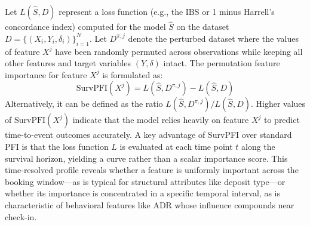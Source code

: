 \documentclass[pdflatex,iicol,sn-mathphys-ay]{sn-jnl}
\theoremstyle{thmstyleone}%
\theoremstyle{thmstyletwo}%
\theoremstyle{thmstylethree}%
\begin{document}
Let $L(\hat{S}, D)$ represent a loss function (e.g., the IBS or 1 minus Harrell's concordance index) computed for the model $\hat{S}$ on the dataset $D = \{(X_i, Y_i, \delta_i)\}_{i=1}^N$. Let $D^{\pi, j}$ denote the perturbed dataset where the values of feature $X^j$ have been randomly permuted across observations while keeping all other features and target variables $(Y, \delta)$ intact. The permutation feature importance for feature $X^j$ is formulated as:
\begin{equation}
\text{SurvPFI}(X^j) = L(\hat{S}, D^{\pi, j}) - L(\hat{S}, D)
\end{equation}
Alternatively, it can be defined as the ratio $L(\hat{S}, D^{\pi, j}) / L(\hat{S}, D)$. Higher values of $\text{SurvPFI}(X^j)$ indicate that the model relies heavily on feature $X^j$ to predict time-to-event outcomes accurately. A key advantage of SurvPFI over standard PFI is that the loss function $L$ is evaluated at each time point $t$ along the survival horizon, yielding a curve rather than a scalar importance score. This time-resolved profile reveals whether a feature is uniformly important across the booking window—as is typical for structural attributes like deposit type—or whether its importance is concentrated in a specific temporal interval, as is characteristic of behavioral features like ADR whose influence compounds near check-in.
\end{document}
